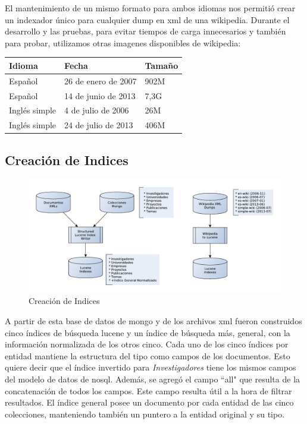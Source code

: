 El mantenimiento de un mismo formato para ambos idiomas nos permitió crear un indexador único para cualquier
dump en xml de una wikipedia. Durante el desarrollo y las pruebas, para evitar tiempos de carga innecesarios y también
para probar, utilizamos otras imagenes disponibles de wikipedia:

\medskip

\begin{center}
\begin{tabular}{ | l | l | l |}
    \hline
    Idioma & Fecha & Tamaño\\ \hline
    Español & 26 de enero de 2007 & 902M \\ \hline
    Español & 14 de junio de 2013 & 7,3G \\ \hline
    Inglés simple & 4 de julio de 2006 & 26M \\ \hline
    Inglés simple & 24 de julio de 2013 & 406M \\ \hline
 \end{tabular}
\end{center}


\subsection{Creación de Indices}

\begin{figure}[H]
  \centering
    \includegraphics[scale=0.86]{graficos/LuceneWritersJuntos}
  \caption{Creación de Indices}
  \label{fig:LuceneIndexWriterBoth}
\end{figure}

A partir de esta base de datos de mongo y de los archivos xml fueron construidos cinco índices
de búsqueda lucene y un índice de búsqueda más, general, con la
información normalizada de los otros cinco. 
Cada uno de los cinco índices por entidad mantiene la estructura del tipo como campos de los documentos.
Esto quiere decir que el índice invertido para \emph{Investigadores} tiene los mismos campos
del modelo de datos de nosql. Además, se agregó el campo ``all" que resulta de la concatenación de
todos los campos. Este campo resulta útil a la hora de filtrar resultados. 
El índice general posee un documento por cada entidad de las cinco colecciones, 
manteniendo también un puntero a la entidad original y su tipo.

